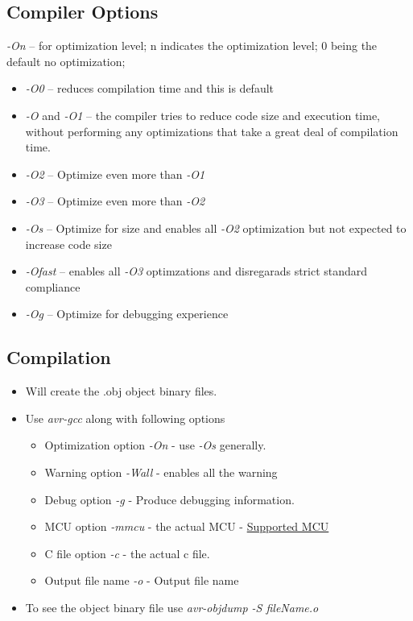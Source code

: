 \documentclass{article}
\begin{document}
\subsection*{Compiler Options\cite{compilerOptimize}} \label{optimization}
\emph{-On} -- for optimization level; n indicates the optimization level; 0 being the default no optimization; 
\begin{itemize}
    \item \emph{-O0} -- reduces compilation time and this is default
    \item \emph{-O} and \emph{-O1} -- the compiler tries to reduce code size and execution time, without performing any optimizations that take a great deal of compilation time.
    \item \emph{-O2} --  Optimize even more than \emph{-O1}
    \item \emph{-O3} --  Optimize even more than \emph{-O2}
    \item \emph{-Os} -- Optimize for size and enables all \emph{-O2} optimization but not expected to increase code size
    \item \emph{-Ofast} -- enables all \emph{-O3} optimzations and disregarads strict standard compliance
    \item \emph{-Og} -- Optimize for debugging experience
\end{itemize}


\subsection*{Compilation} 
\begin{itemize}
    \item Will create the .obj object binary files.
    \item Use \emph{avr-gcc} along with following options
    \begin{itemize}
        \item Optimization option \emph{-On} - use \emph{-Os} generally.
        \item Warning option \emph{-Wall} - enables all the warning
        \item Debug option \emph{-g} - Produce debugging information.
        \item MCU option \emph{-mmcu} - the actual MCU - \href{https://www.nongnu.org/avr-libc/user-manual/#supp_devices}{Supported MCU}
        \item C file option \emph{-c} - the actual c file.
        \item Output file name \emph{-o} - Output file name
    \end{itemize}
    \item To see the object binary file use \emph{avr-objdump -S fileName.o}
\end{itemize}
\end{document}
